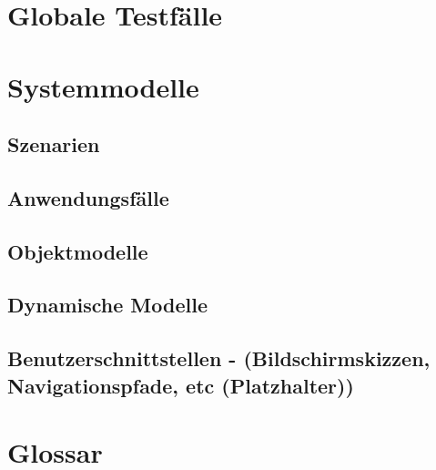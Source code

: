 \documentclass[11pt,a4paper]{article}
\begin{document}
\section{Globale Testfälle}


\section{Systemmodelle}


\subsection{Szenarien}


\subsection{Anwendungsfälle}

\subsection{Objektmodelle}

\subsection{Dynamische Modelle}

\subsection{Benutzerschnittstellen - (Bildschirmskizzen, Navigationspfade, etc (Platzhalter))}


\section{Glossar}
\end{document}
